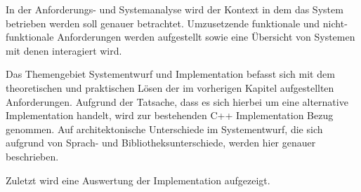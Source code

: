 In der Anforderungs- und Systemanalyse wird der Kontext in dem das System betrieben werden soll genauer betrachtet. Umzusetzende funktionale und nicht-funktionale Anforderungen werden aufgestellt sowie eine Übersicht von Systemen mit denen interagiert wird.

Das Themengebiet Systementwurf und Implementation befasst sich mit dem theoretischen und praktischen Lösen der im vorherigen Kapitel aufgestellten Anforderungen. Aufgrund der Tatsache, dass es sich hierbei
um eine alternative Implementation handelt, wird zur bestehenden C++ Implementation Bezug genommen.
Auf architektonische Unterschiede im Systementwurf, die sich aufgrund von Sprach- und Bibliotheksunterschiede, werden hier genauer beschrieben.

Zuletzt wird eine Auswertung der Implementation aufgezeigt. 